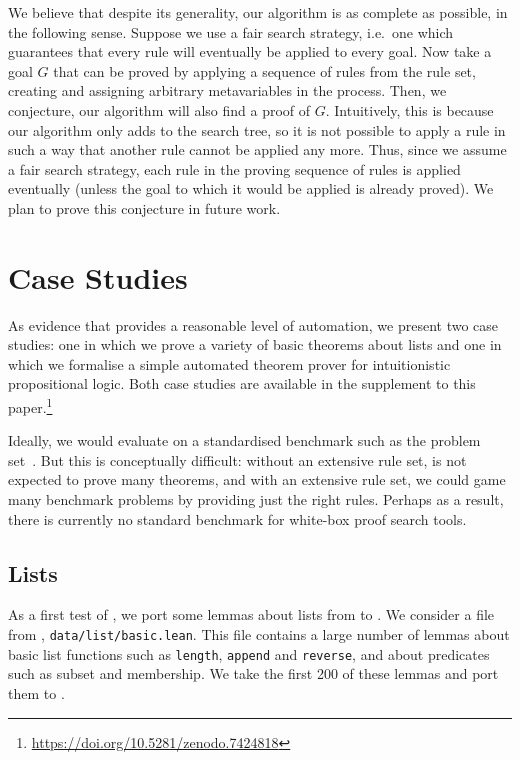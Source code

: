 We believe that despite its generality, our algorithm is as complete as possible, in the following sense.
Suppose we use a fair search strategy, i.e.\ one which guarantees that every rule will eventually be applied to every goal.
Now take a goal $G$ that can be proved by applying a sequence of rules from the rule set, creating and assigning arbitrary metavariables in the process.
Then, we conjecture, our algorithm will also find a proof of $G$.
Intuitively, this is because our algorithm only adds to the search tree, so it is not possible to apply a rule in such a way that another rule cannot be applied any more.
Thus, since we assume a fair search strategy, each rule in the proving sequence of rules is applied eventually (unless the goal to which it would be applied is already proved).
We plan to prove this conjecture in future work.


\section{Case Studies}%
\label{sec:case-studies}

As evidence that \Aesop{} provides a reasonable level of automation, we present two case studies: one in which we prove a variety of basic theorems about lists and one in which we formalise a simple automated theorem prover for intuitionistic propositional logic.
Both case studies are available in the supplement to this paper.\footnote{\url{https://doi.org/10.5281/zenodo.7424818}}

Ideally, we would evaluate \Aesop{} on a standardised benchmark such as the \TPTP{} problem set~\cite{TPTP}.
But this is conceptually difficult: without an extensive rule set, \Aesop{} is not expected to prove many theorems, and with an extensive rule set, we could game many benchmark problems by providing just the right rules.
Perhaps as a result, there is currently no standard benchmark for white-box proof search tools.


\subsection{Lists}%
\label{sec:lists}

As a first test of \Aesop, we port some lemmas about lists from \Leanthree{} to \Leanfour.
We consider a file from \mathlib, \texttt{data/list/basic.lean}.
This file contains a large number of lemmas about basic list functions such as \texttt{length}, \texttt{append} and \texttt{reverse}, and about predicates such as subset and membership.
We take the first 200 of these lemmas and port them to \Leanfour.

